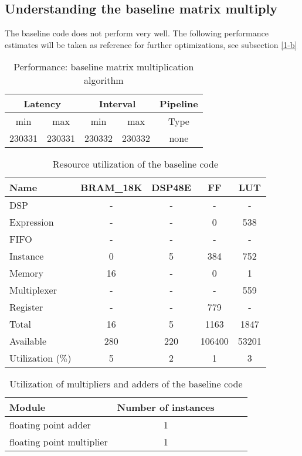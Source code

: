 \documentclass[../main.tex]{subfiles}
\begin{document}
\subsection{Understanding the baseline matrix multiply}

The baseline code does not perform very well. The following performance estimates will be taken as reference for further optimizations, see subsection \ref{1-b}
\begin{table}[H]
	\centering
	\begin{tabular}{ccccc}
		\multicolumn{2}{c}{Latency} & \multicolumn{2}{c}{Interval} & Pipeline\\
		\hline
		min  &   max  &   min  &   max  &   Type  \\
		230331&  230331&  230332&  230332&   none  
	\end{tabular}
	\caption{Performance: baseline matrix multiplication algorithm}
	\label{1-a-perf-table}
\end{table}

\begin{table}[H]
	\centering
	\begin{tabular}{lcccc}
		Name      & BRAM\_18K& DSP48E&   FF   &  LUT  \\
		\hline
		DSP              &        -&      -&       -&      -\\
		Expression       &        -&      -&       0&    538\\
		FIFO             &        -&      -&       -&      -\\
		Instance         &        0&      5&     384&    752\\
		Memory           &       16&      -&       0&      1\\
		Multiplexer      &        -&      -&       -&    559\\
		Register         &        -&      -&     779&      -\\
		\hline
		Total            &       16&      5&    1163&   1847\\
		Available        &      280&    220&  106400&  53201\\
		\hline
		Utilization ($\%$)  &        5&      2&       1&      3
	\end{tabular}
	\caption{Resource utilization of the baseline code}
	\label{1-a-resources}
\end{table}

\begin{table}[H]
	\centering
	\begin{tabular}{lcccc}
		Module & Number of instances \\
		\hline
		floating point adder & 1 \\
		floating point multiplier & 1
	\end{tabular}
	\caption{Utilization of multipliers and adders of the baseline code}
	\label{1-a-resources-arithmetic}
\end{table}
\end{document}
